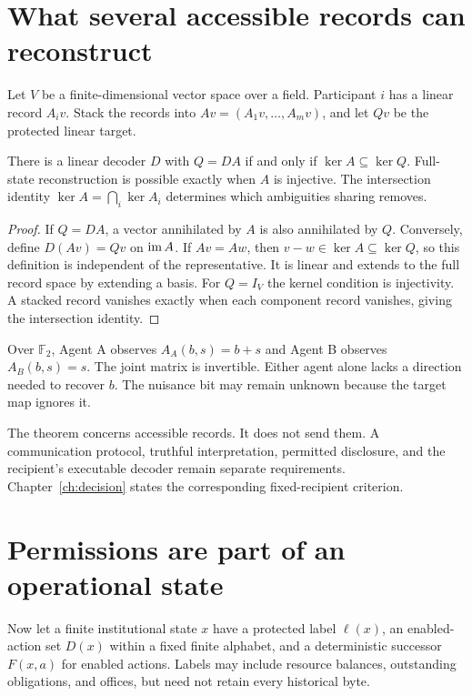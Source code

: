 \section{What several accessible records can reconstruct}
Let $V$ be a finite-dimensional vector space over a field. Participant $i$ has a linear record $A_i v$. Stack the records into $Av=(A_1v,\ldots,A_mv)$, and let $Qv$ be the protected linear target.

\begin{proposition}\label{r:reconstruction}
There is a linear decoder $D$ with $Q=DA$ if and only if $\ker A\subseteq\ker Q$. Full-state reconstruction is possible exactly when $A$ is injective. The intersection identity $\ker A=\bigcap_i\ker A_i$ determines which ambiguities sharing removes.
\end{proposition}
\begin{proof}
If $Q=DA$, a vector annihilated by $A$ is also annihilated by $Q$. Conversely, define $D(Av)=Qv$ on $\operatorname{im} A$. If $Av=Aw$, then $v-w\in\ker A\subseteq\ker Q$, so this definition is independent of the representative. It is linear and extends to the full record space by extending a basis. For $Q=I_V$ the kernel condition is injectivity. A stacked record vanishes exactly when each component record vanishes, giving the intersection identity.
\end{proof}

Over $\mathbb F_2$, Agent A observes $A_A(b,s)=b+s$ and Agent B observes $A_B(b,s)=s$. The joint matrix is invertible. Either agent alone lacks a direction needed to recover $b$. The nuisance bit may remain unknown because the target map ignores it.

The theorem concerns accessible records. It does not send them. A communication protocol, truthful interpretation, permitted disclosure, and the recipient's executable decoder remain separate requirements. Chapter~\ref{ch:decision} states the corresponding fixed-recipient criterion.

\section{Permissions are part of an operational state}
Now let a finite institutional state $x$ have a protected label $\ell(x)$, an enabled-action set $D(x)$ within a fixed finite alphabet, and a deterministic successor $F(x,a)$ for enabled actions. Labels may include resource balances, outstanding obligations, and offices, but need not retain every historical byte.

